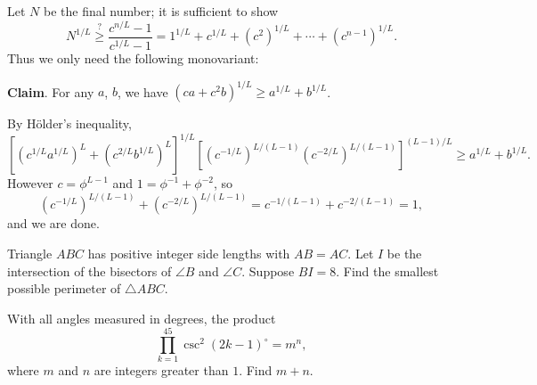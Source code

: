 \documentclass[11pt]{article}
\theoremstyle{definition}
\begin{document}
\begin{solution}[name={Solution by TheUltimate123}]
	Let $N$ be the final number; it is sufficient to show\[N^{1/L}\stackrel?\ge\frac{c^{n/L}-1}{c^{1/L}-1}=1^{1/L}+c^{1/L}+\left(c^2\right)^{1/L}+\cdots+\left(c^{n-1}\right)^{1/L}.\]Thus we only need the following monovariant:
	
	\textbf{Claim}. For any $a$, $b$, we have $\left(ca+c^2b\right)^{1/L}\ge a^{1/L}+b^{1/L}$.
	
	By H\"older's inequality,\[ \left[\left(c^{1/L}a^{1/L}\right)^L+\left(c^{2/L}b^{1/L}\right)^L\right]^{1/L}\left[\left(c^{-1/L}\right)^{L/(L-1)}\left(c^{-2/L}\right)^{L/(L-1)}\right]^{(L-1)/L}\ge a^{1/L}+b^{1/L}.\]However $c=\phi^{L-1}$ and $1=\phi^{-1}+\phi^{-2}$, so\[\left(c^{-1/L}\right)^{L/(L-1)}+\left(c^{-2/L}\right)^{L/(L-1)}=c^{-1/(L-1)}+c^{-2/(L-1)}=1,\]and we are done.
\end{solution}










\begin{question}[name={2015 AIME I, \href{https://artofproblemsolving.com/community/c4p4622260}{Problem 11}}]
	Triangle $ABC$ has positive integer side lengths with $AB=AC$. Let $I$ be the intersection of the bisectors of $\angle B$ and $\angle C$. Suppose $BI=8$. Find the smallest possible perimeter of $\triangle ABC$.
\end{question}


%	













\begin{question}[name={2015 AIME I, \href{https://artofproblemsolving.com/community/c4p4622272}{Problem 13}}]
	With all angles measured in degrees, the product $$\prod_{k=1}^{45} \csc^2(2k-1)^\circ=m^n,$$ where $m$ and $n$ are integers greater than $1$. Find $m+n$.
\end{question}


%	
\end{document}
